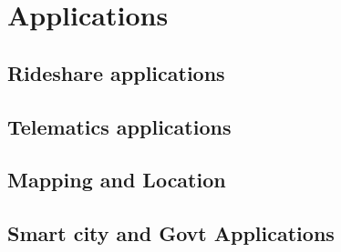 \section{Applications}
\label{sec:apps}


\subsection{Rideshare applications}


\subsection{Telematics applications}

\subsection{Mapping and Location}

\subsection{Smart city and Govt Applications}
